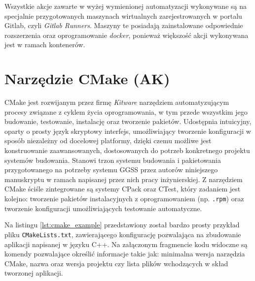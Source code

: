 Wszystkie akcje zawarte w wyżej wymienionej automatyzacji wykonywane są na specjalnie przygotowanych maszynach wirtualnych zarejestrowanych w portalu Gitlab, czyli \emph{Gitlab Runners}. Maszyny te posiadają zainstalowane odpowiednie rozszerzenia oraz oprogramowanie \emph{docker}, ponieważ większość akcji wykonywana jest w ramach kontenerów.


\section{Narzędzie CMake (AK)}
CMake jest rozwijanym przez firmę \emph{Kitware} narzędziem automatyzującym procesy związane z cyklem życia oprogramowania, w tym przede wszystkim jego budowanie, testowanie, instalację oraz tworzenie pakietów. Udostępnia intuicyjny, oparty o prosty język skryptowy interfejs, umożliwiający tworzenie konfiguracji w sposób niezależny od docelowej platformy, dzięki czemu możliwe jest konstruowanie zaawansowanych, dostosowanych do potrzeb konkretnego projektu systemów budowania. Stanowi trzon systemu budowania i pakietowania przygotowanego na potrzeby systemu GGSS przez autorów niniejszego manuskryptu w ramach napisanej przez nich pracy inżynierskiej. Z narzędziem CMake ściśle zintegrowane są systemy CPack oraz CTest, który zadaniem jest kolejno: tworzenie pakietów instalacyjnych z oprogramowaniem (np. \lstinline{.rpm}) oraz tworzenie konfiguracji umożliwiających testowanie automatyczne.

Na listingu \ref{lst:cmake_example} przedstawiony został bardzo prosty przykład pliku \lstinline{CMakeLists.txt}, zawierającego konfigurację pozwalająca na zbudowanie aplikacji napisanej w języku C++. Na załączonym fragmencie kodu widoczne są komendy pozwalające określić informacje takie jak: minimalna wersja narzędzia CMake, nazwa oraz wersja projektu czy lista plików wchodzących w skład tworzonej aplikacji.






